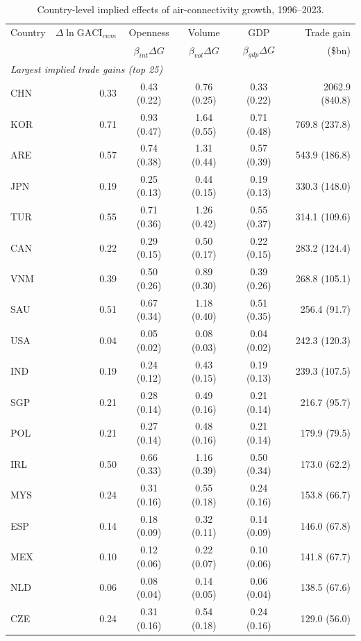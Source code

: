 \begin{table}[H]
\centering
\caption{Country-level implied effects of air-connectivity growth, 1996--2023.}
\label{tab:country}
\begin{threeparttable}
\scriptsize
\begin{tabular}{lrcccr}
\toprule
Country & $\Delta\ln\mathrm{GACI}_{cwm}$ & Openness & Volume & GDP & Trade gain \\
 & & $\beta_{int}\Delta G$ & $\beta_{vol}\Delta G$ & $\beta_{gdp}\Delta G$ & (\$bn) \\
\midrule
\multicolumn{6}{l}{\emph{Largest implied trade gains (top 25)}}\\
CHN & 0.33 & 0.43 (0.22) & 0.76 (0.25) & 0.33 (0.22) & 2062.9 (840.8) \\
KOR & 0.71 & 0.93 (0.47) & 1.64 (0.55) & 0.71 (0.48) & 769.8 (237.8) \\
ARE & 0.57 & 0.74 (0.38) & 1.31 (0.44) & 0.57 (0.39) & 543.9 (186.8) \\
JPN & 0.19 & 0.25 (0.13) & 0.44 (0.15) & 0.19 (0.13) & 330.3 (148.0) \\
TUR & 0.55 & 0.71 (0.36) & 1.26 (0.42) & 0.55 (0.37) & 314.1 (109.6) \\
CAN & 0.22 & 0.29 (0.15) & 0.50 (0.17) & 0.22 (0.15) & 283.2 (124.4) \\
VNM & 0.39 & 0.50 (0.26) & 0.89 (0.30) & 0.39 (0.26) & 268.8 (105.1) \\
SAU & 0.51 & 0.67 (0.34) & 1.18 (0.40) & 0.51 (0.35) & 256.4 (91.7) \\
USA & 0.04 & 0.05 (0.02) & 0.08 (0.03) & 0.04 (0.02) & 242.3 (120.3) \\
IND & 0.19 & 0.24 (0.12) & 0.43 (0.15) & 0.19 (0.13) & 239.3 (107.5) \\
SGP & 0.21 & 0.28 (0.14) & 0.49 (0.16) & 0.21 (0.14) & 216.7 (95.7) \\
POL & 0.21 & 0.27 (0.14) & 0.48 (0.16) & 0.21 (0.14) & 179.9 (79.5) \\
IRL & 0.50 & 0.66 (0.33) & 1.16 (0.39) & 0.50 (0.34) & 173.0 (62.2) \\
MYS & 0.24 & 0.31 (0.16) & 0.55 (0.18) & 0.24 (0.16) & 153.8 (66.7) \\
ESP & 0.14 & 0.18 (0.09) & 0.32 (0.11) & 0.14 (0.09) & 146.0 (67.8) \\
MEX & 0.10 & 0.12 (0.06) & 0.22 (0.07) & 0.10 (0.06) & 141.8 (67.7) \\
NLD & 0.06 & 0.08 (0.04) & 0.14 (0.05) & 0.06 (0.04) & 138.5 (67.6) \\
CZE & 0.24 & 0.31 (0.16) & 0.54 (0.18) & 0.24 (0.16) & 129.0 (56.0) \\

\end{tabular}
\end{threeparttable}
\end{table}
